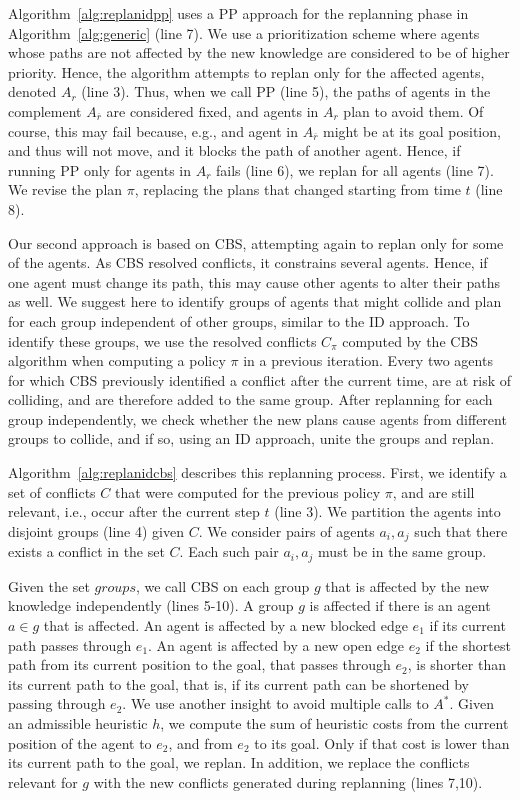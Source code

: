 \documentclass[letterpaper]{article} %
\def\
UrlFont{\rm}  %
\theoremstyle{definition}
\begin{document}
Algorithm~\ref{alg:replanidpp} uses a PP approach for the replanning phase in Algorithm~\ref{alg:generic} (line 7). We use a prioritization scheme where agents whose paths are not affected by the new knowledge are considered to be of higher priority. Hence, the algorithm attempts to replan only for the affected agents, denoted $A_r$ (line 3). Thus, when we call PP (line 5), the paths of agents in the complement $A_{\overline{r}}$ are considered fixed, and agents in $A_r$ plan to avoid them. Of course, this may fail because, e.g., and agent in $A_{\overline{r}}$ might be at its goal position, and thus will not move, and it blocks the path of another agent. Hence, if running PP only for agents in $A_r$ fails (line 6), we replan for all agents (line 7). We revise the plan $\pi$, replacing the plans that changed starting from time $t$ (line 8).

Our second approach is based on CBS, attempting again to replan only for some of the agents. As CBS resolved conflicts, it constrains several agents. Hence, if one agent must change its path, this may cause other agents to alter their paths as well.
We suggest here to identify groups of agents that might collide and plan for each group independent of other groups, similar to the ID approach. To identify these groups, we use the resolved conflicts $C_\pi$ computed by the CBS algorithm when computing a policy $\pi$ in a previous iteration. Every two agents for which CBS previously identified a conflict after the current time, are at risk of colliding, and are therefore added to the same group. 
After replanning for each group independently, we check whether the new plans cause agents from different groups to collide, and if so, using an ID approach, unite the groups and replan.

Algorithm~\ref{alg:replanidcbs} describes this replanning process. First, we identify a set of conflicts $C$ that were computed for the previous policy $\pi$, and are still relevant, i.e., occur after the current step $t$ (line 3). We partition the agents into disjoint groups (line 4) given $C$. We consider pairs of agents $a_i,a_j$ such that there exists a conflict in the set $C$. Each such pair $a_i,a_j$ must be in the same group.

Given the set $groups$, we call CBS on each group $g$ that is affected by the new knowledge independently (lines 5-10). A group $g$ is affected if there is an agent $a \in g$ that is affected. An agent is affected by a new blocked edge $e_1$ if its current path passes through $e_1$. An agent is affected by a new open edge $e_2$ if the shortest path from its current position to the goal, that passes through $e_2$, is shorter than its current path to the goal, that is, if its current path can be shortened by passing through $e_2$. We use another insight to avoid multiple calls to $A^*$. Given an admissible heuristic $h$, we compute the sum of heuristic costs from the current position of the agent to $e_2$, and from $e_2$ to its goal. Only if that cost is lower than its current path to the goal, we replan. In addition, we replace the conflicts relevant for $g$ with the new conflicts generated during replanning (lines 7,10).
\end{document}
